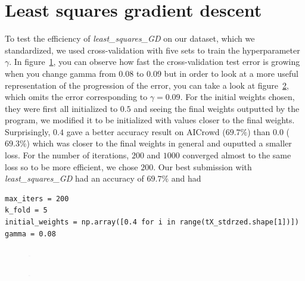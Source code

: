 \documentclass[../proj1_report.tex]{subfiles}
\begin{document}
\section{Least squares gradient descent}
To test the efficiency of \textit{least_squares_GD} on our dataset, which we standardized, we used cross-validation with five sets to train the hyperparameter $\gamma$.
In figure~\ref{fig:lsgd}, you can observe how fast the cross-validation test error is growing when you change gamma from $0.08$ to $0.09$ but in order to look at a more useful representation of the progression of the error, you can take a look at figure~\ref{fig:lsgd_useful}, which omits the error corresponding to $\gamma = 0.09$.
For the initial weights chosen, they were first all initialized to $0.5$ and seeing the final weights outputted by the program, we modified it to be initialized with values closer to the final weights. Surprisingly, $0.4$ gave a better accuracy result on AICrowd ($69.7\%$) than $0.0$ ($69.3\%$) which was closer to the final weights in general and ouputted a smaller loss.
For the number of iterations, $200$ and $1000$ converged almost to the same loss so to be more efficient, we chose $200$.
Our best submission with \textit{least_squares_GD} had an accuracy of $69.7\%$ and had 
\begin{lstlisting}
max_iters = 200
k_fold = 5
initial_weights = np.array([0.4 for i in range(tX_stdrzed.shape[1])])
gamma = 0.08
\end{lstlisting}

\begin{figure}
    \includegraphics[width= 3, height = 3]{raw_data_least_squares_GD.png}
    \label{fig:lsgd}
\end{figure}

\begin{figure}
    \includegraphics[width= 3, height = 3]{raw_data_least_squares_GD_useful.png}
    \label{fig:lsgd_useful}
\end{figure}
\end{document}
